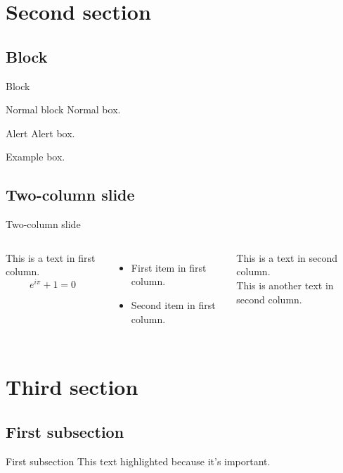 \documentclass[10pt]{beamer}
\begin{document}
\section{Second section}
\subsection{Block}
\begin{frame}{Block}
    \begin{block}{Normal block}
        Normal box.
    \end{block} 
        
    \begin{alertblock}{Alert}
        Alert box.
    \end{alertblock}
        
    \begin{examples}
        Example box.
    \end{examples}
\end{frame}
    
\subsection{Two-column slide}
\begin{frame}{Two-column slide}
    \begin{columns}
    This is a text in first column. \[  e^{i\pi} + 1 = 0 \]
        \begin{itemize}
            \item First item in first column.
            \item Second item in first column.
        \end{itemize}
    
    This is a text in second column. \\
    This is another text in second column. 
    \end{columns}
\end{frame}

\section{Third section}
\subsection{First subsection}
\begin{frame}{First subsection}
    \alert{This text highlighted} because it's \textcolor{ocean}{important.}
\end{frame}
\end{document}
